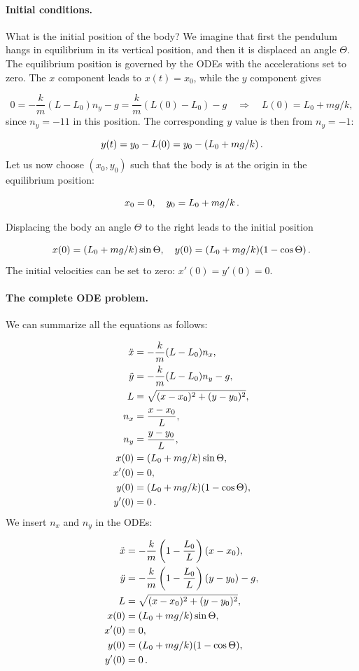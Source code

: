 \documentclass[%
oneside,                 %
final,                   %
10pt]{article}
\begin{document}
\paragraph{Initial conditions.}
What is the initial position of the body? We imagine that first the
pendulum hangs in equilibrium in its vertical position, and then it is
displaced an angle $\Theta$. The equilibrium position is governed
by the ODEs with the accelerations set to zero.
The $x$ component leads to $x(t)=x_0$, while the $y$ component gives

\[ 0 = - \frac{k}{m}(L-L_0)n_y - g = \frac{k}{m}(L(0)-L_0) - g\quad\Rightarrow\quad
L(0) = L_0 + mg/k,\]
since $n_y=-11$ in this position. The corresponding $y$ value is then
from $n_y=-1$:

\[ y(t) = y_0 - L(0) = y_0 - (L_0 + mg/k)\tp\]
Let us now choose $(x_0,y_0)$ such that the body is at the origin
in the equilibrium position:

\[ x_0 =0,\quad y_0 = L_0 + mg/k\tp\]

Displacing the body an angle $\Theta$ to the right leads to the
initial position

\[ x(0)=(L_0+mg/k)\sin\Theta,\quad y(0)=(L_0+mg/k)(1-\cos\Theta)\tp\]
The initial velocities can be set to zero: $x'(0)=y'(0)=0$.

\paragraph{The complete ODE problem.}
We can summarize all the equations as follows:

\begin{align*}
\ddot x &= -\frac{k}{m}(L-L_0)n_x,
\\ 
\ddot y &= -\frac{k}{m}(L-L_0)n_y - g,
\\ 
L &= \sqrt{(x-x_0)^2 + (y-y_0)^2},
\\ 
n_x &= \frac{x-x_0}{L},
\\ 
n_y &= \frac{y-y_0}{L},
\\ 
x(0) &= (L_0+mg/k)\sin\Theta,
\\ 
x'(0) &= 0,
\\ 
y(0) & =(L_0+mg/k)(1-\cos\Theta),
\\ 
y'(0) &= 0\tp
\end{align*}
We insert $n_x$ and $n_y$  in the ODEs:

\begin{align}
\ddot x &= -\frac{k}{m}\left(1 -\frac{L_0}{L}\right)(x-x_0),
\label{vib:app:pendulum_elastic:x}\\ 
\ddot y &= -\frac{k}{m}\left(1 -\frac{L_0}{L}\right)(y-y_0) - g,
\label{vib:app:pendulum_elastic:y}\\ 
L &= \sqrt{(x-x_0)^2 + (y-y_0)^2},
\label{vib:app:pendulum_elastic:L}\\ 
x(0) &= (L_0+mg/k)\sin\Theta,
\label{vib:app:pendulum_elastic:x0}\\ 
x'(0) &= 0,
\label{vib:app:pendulum_elastic:vx0}\\ 
y(0) & =(L_0+mg/k)(1-\cos\Theta),
\label{vib:app:pendulum_elastic:y0}\\ 
y'(0) &= 0\tp
\label{vib:app:pendulum_elastic:vy0}
\end{align}
\end{document}

